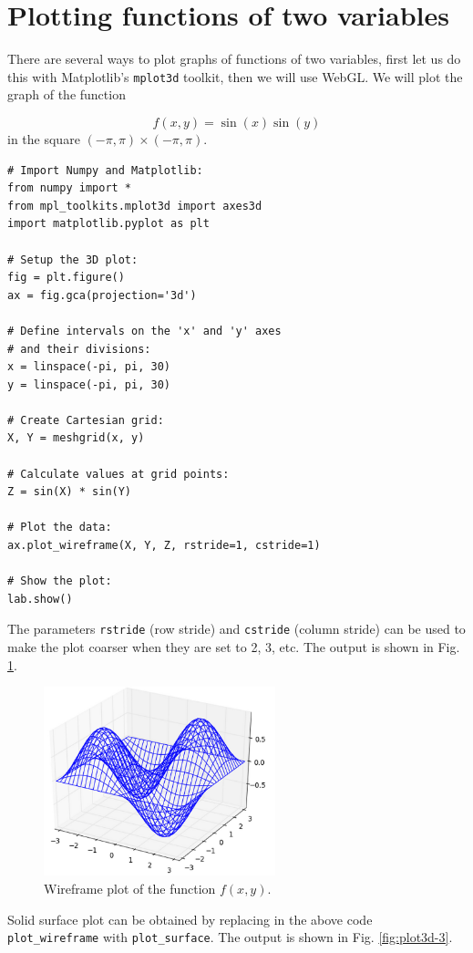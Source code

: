 \documentclass{article}
\begin{document}
\section{Plotting functions of two variables}

There are several ways to plot graphs of functions of two variables, 
first let us do this with Matplotlib's {\tt mplot3d} toolkit, then we will
use WebGL. We will plot the graph of the function 

$$
  f(x, y) = \sin(x) \sin(y)
$$
in the square $(-\pi, \pi) \times (-\pi, \pi)$.

\begin{verbatim}
# Import Numpy and Matplotlib:
from numpy import *
from mpl_toolkits.mplot3d import axes3d
import matplotlib.pyplot as plt

# Setup the 3D plot:
fig = plt.figure()
ax = fig.gca(projection='3d')

# Define intervals on the 'x' and 'y' axes
# and their divisions:
x = linspace(-pi, pi, 30)
y = linspace(-pi, pi, 30)

# Create Cartesian grid:
X, Y = meshgrid(x, y)

# Calculate values at grid points:
Z = sin(X) * sin(Y)

# Plot the data:
ax.plot_wireframe(X, Y, Z, rstride=1, cstride=1)

# Show the plot:
lab.show()
\end{verbatim}
The parameters {\tt rstride} (row stride) and {\tt cstride} (column stride)
can be used to make the plot coarser when they are set to 2, 3, etc.
The output is shown in Fig. \ref{fig:plot3d-2}.

\begin{figure}[!ht]
\begin{center}
\includegraphics[width=0.6\textwidth]{img/plot3d-2.png}
\end{center}
\vspace{-4mm}
\caption{Wireframe plot of the function $f(x, y)$.}
\label{fig:plot3d-2}
\end{figure}
\noindent
Solid surface plot can be obtained by replacing in the above code 
{\tt plot\_wireframe} with {\tt plot\_surface}. 
The output is shown in Fig. \ref{fig:plot3d-3}.
\end{document}
